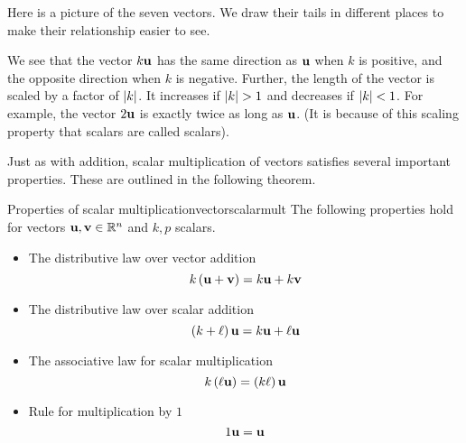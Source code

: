 \begin{solution}
  Here is a picture of the seven vectors. We draw their tails in
  different places to make their relationship easier to see.
  \begin{center}
  \end{center}
  We see that the vector $k\mbox{\bf u}$ has the same direction as
  $\mbox{\bf u}$ when $k$ is positive, and the opposite direction when $k$
  is negative. Further, the length of the vector is scaled by a factor
  of $\left|k\right|$. It increases if $\abs{k}>1$ and decreases if
  $\left|k\right|<1$. For example, the vector $2\mbox{\bf u}$ is exactly twice as
  long as $\mbox{\bf u}$.  (It is because of this scaling property that
  scalars are called scalars).
\end{solution}

Just as with addition, scalar multiplication of vectors satisfies
several important properties. These are outlined in the following
theorem.

\begin{theorem}{Properties of scalar multiplication}{vectorscalarmult}
The following properties hold for vectors $\mbox{\bf u},\mbox{\bf v}\in \mathbb{R}^{n}$ and $k,p $
scalars.
\begin{itemize}
\item The distributive law over vector addition
\begin{equation*}
k \left(\mbox{\bf u}+\mbox{\bf v}\right) = k\mbox{\bf u}+ k\mbox{\bf v}
\end{equation*}
\item The distributive law over scalar addition
\begin{equation*}
\left(k + \ell  \right)\mbox{\bf u} = k \mbox{\bf u}+\ell \mbox{\bf u}
\end{equation*}
\item The associative law for scalar multiplication
\begin{equation*}
k \left(\ell \mbox{\bf u}\right) = \left(k \ell \right)\mbox{\bf u}
\end{equation*}
\item Rule for multiplication by $1$
\begin{equation*}
1\mbox{\bf u}=\mbox{\bf u}  
\end{equation*}
\end{itemize}
\end{theorem}

